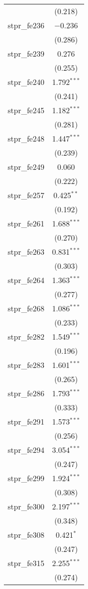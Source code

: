 \begin{table}[!htbp]
\begin{tabular}{@{\extracolsep{5pt}}lc}
  & (0.218) \\ 
  stpr\_fe236 & $-$0.236 \\ 
  & (0.286) \\ 
  stpr\_fe239 & 0.276 \\ 
  & (0.255) \\ 
  stpr\_fe240 & 1.792$^{***}$ \\ 
  & (0.241) \\ 
  stpr\_fe245 & 1.182$^{***}$ \\ 
  & (0.281) \\ 
  stpr\_fe248 & 1.447$^{***}$ \\ 
  & (0.239) \\ 
  stpr\_fe249 & 0.060 \\ 
  & (0.222) \\ 
  stpr\_fe257 & 0.425$^{**}$ \\ 
  & (0.192) \\ 
  stpr\_fe261 & 1.688$^{***}$ \\ 
  & (0.270) \\ 
  stpr\_fe263 & 0.831$^{***}$ \\ 
  & (0.303) \\ 
  stpr\_fe264 & 1.363$^{***}$ \\ 
  & (0.277) \\ 
  stpr\_fe268 & 1.086$^{***}$ \\ 
  & (0.233) \\ 
  stpr\_fe282 & 1.549$^{***}$ \\ 
  & (0.196) \\ 
  stpr\_fe283 & 1.601$^{***}$ \\ 
  & (0.265) \\ 
  stpr\_fe286 & 1.793$^{***}$ \\ 
  & (0.333) \\ 
  stpr\_fe291 & 1.573$^{***}$ \\ 
  & (0.256) \\ 
  stpr\_fe294 & 3.054$^{***}$ \\ 
  & (0.247) \\ 
  stpr\_fe299 & 1.924$^{***}$ \\ 
  & (0.308) \\ 
  stpr\_fe300 & 2.197$^{***}$ \\ 
  & (0.348) \\ 
  stpr\_fe308 & 0.421$^{*}$ \\ 
  & (0.247) \\ 
  stpr\_fe315 & 2.255$^{***}$ \\ 
  & (0.274) \\ 

\end{tabular}
\end{table}
